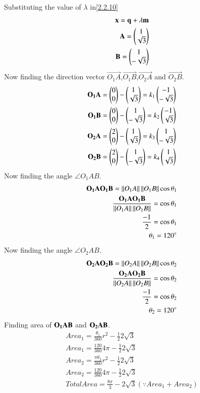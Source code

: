 \documentclass[journal,12pt,twocolumn]{IEEEtran}
\begin{document}
Substituting the value of $\lambda$ in\eqref{2.2.10}
\begin{align}
\mathbf{x}=\mathbf{q}+\lambda\mathbf{m}\\
\mathbf{A}=\begin{pmatrix}1\\\sqrt{3}\end{pmatrix}\\
\mathbf{B}=\begin{pmatrix}1\\-\sqrt{3}\end{pmatrix}
 \end{align} 
 Now finding the direction vector $\vec{O_1A}$,$\vec{O_1B}$,$\vec{O_2A}$ and $\vec{O_2B}$.
 \begin{align}
\mathbf{O_1A}=\begin{pmatrix}0\\0\end{pmatrix}-\begin{pmatrix}1\\\sqrt{3}\end{pmatrix}=k_1\begin{pmatrix}-1\\-\sqrt{3}\end{pmatrix}\\
\mathbf{O_1B}=\begin{pmatrix}0\\0\end{pmatrix}-\begin{pmatrix}1\\-\sqrt{3}\end{pmatrix}=k_2\begin{pmatrix}-1\\\sqrt{3}\end{pmatrix}\\
\mathbf{O_2A}=\begin{pmatrix}2\\0\end{pmatrix}-\begin{pmatrix}1\\\sqrt{3}\end{pmatrix}=k_3\begin{pmatrix}1\\-\sqrt{3}\end{pmatrix}\\
\mathbf{O_2B}=\begin{pmatrix}2\\0\end{pmatrix}-\begin{pmatrix}1\\-\sqrt{3}\end{pmatrix}=k_4\begin{pmatrix}1\\\sqrt{3}\end{pmatrix}
\end{align}
Now finding the angle $\angle{O_1AB}$.
\begin{align}
    \mathbf{O_1A}\mathbf{O_1B}=\left\lVert O_1A\right\rVert\left\lVert O_1B\right\rVert\cos\theta_1\\
    \frac{\mathbf{O_1A}\mathbf{O_1B}}{\left\lVert O_1A\right\rVert\left\lVert O_1B\right\rVert}=\cos\theta_1\\
    \frac{-1}{2}=\cos\theta_1\\
    \theta_1=120^{\circ}
\end{align}
Now finding the angle $\angle{O_2AB}$.
\begin{align}
    \mathbf{O_2A}\mathbf{O_2B}=\left\lVert O_2A\right\rVert\left\lVert O_2B\right\rVert\cos\theta_2\\
    \frac{\mathbf{O_2A}\mathbf{O_2B}}{\left\lVert O_2A\right\rVert\left\lVert O_2B\right\rVert}=\cos\theta_2\\
    \frac{-1}{2}=\cos\theta_2\\
    \theta_2=120^{\circ}
\end{align}
Finding area of $\bf{O_1AB}$ and $\bf{O_2AB}$.
 \begin{align}
Area_1=\frac{\theta_1}{360}r^2-\frac{1}{2}2\sqrt{3}\\
Area_1=\frac{120}{360}4\pi-\frac{1}{2}2\sqrt{3}\\
Area_2=\frac{\pi\theta_2}{360}r^2-\frac{1}{2}2\sqrt{3}\\
Area_2=\frac{120}{360}4\pi-\frac{1}{2}2\sqrt{3}\\
Total Area=\frac{8\pi}{3}-2\sqrt{3}{(\because Area_1+Area_2)}
\end{align}
\end{document}
